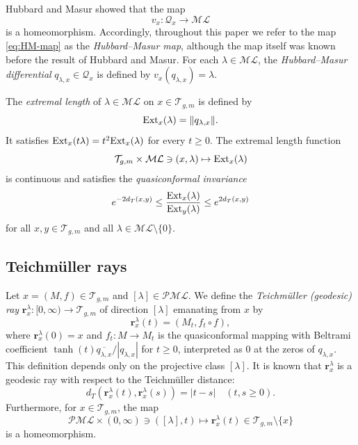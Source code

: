 \documentclass[dvipdfmx]{amsart}
\theoremstyle{remark}
\newcommand{\ext}{{\rm Ext}}
\newcommand{\teich}{\mathcal{T}}
\newcommand{\ray}{{\boldsymbol r}}
\newcommand{\ml}{\mathcal{ML}}
\newcommand{\pml}{\mathcal{PML}}
\begin{document}
Hubbard and Masur \cite{HubbardMasur1979} showed that the map
\begin{equation}
\label{eq:HM-map}
v_x\colon \mathcal{Q}_x\longrightarrow \ml
\end{equation}
is a homeomorphism. Accordingly, throughout this paper we refer to the map \eqref{eq:HM-map} as the \emph{Hubbard--Masur map}, although the map itself was known before the result of Hubbard and Masur. For each $\lambda\in\ml$, the \emph{Hubbard--Masur differential} $q_{\lambda,x}\in\mathcal{Q}_x$ is defined by $v_x(q_{\lambda,x})=\lambda$.

The \emph{extremal length} of $\lambda\in \ml$ on $x\in \teich_{g,m}$ is defined by
\[
\ext_x(\lambda)=\|q_{\lambda,x}\|.
\]
It satisfies $\ext_x(t\lambda)=t^2\ext_x(\lambda)$ for every $t\ge 0$.
The extremal length function
\[
\teich_{g,m}\times \ml\ni (x,\lambda)\mapsto \ext_x(\lambda)
\]
is continuous and satisfies the \emph{quasiconformal invariance}
\begin{equation}
\label{eq:QC-inv_extremal_length}
e^{-2d_T(x,y)}\le \frac{\ext_x(\lambda)}{\ext_y(\lambda)}\le e^{2d_T(x,y)}
\end{equation}
for all $x,y\in \teich_{g,m}$ and all $\lambda\in\ml\setminus\{0\}$.

\subsection{Teichm\"uller rays}
Let $x=(M,f)\in\teich_{g,m}$ and $[\lambda]\in\pml$. We define the \emph{Teichm\"uller (geodesic) ray} $\ray^\lambda_x\colon[0,\infty)\to\teich_{g,m}$ of direction $[\lambda]$ emanating from $x$ by
\[
\ray^{\lambda}_x(t)=(M_t,f_t\circ f),
\]
where $\ray^{\lambda}_x(0)=x$ and $f_t\colon M\to M_t$ is the quasiconformal mapping with Beltrami coefficient $\tanh(t)\overline{q_{\lambda,x}}/|q_{\lambda,x}|$ for $t\ge 0$, interpreted as $0$ at the zeros of $q_{\lambda,x}$. This definition depends only on the projective class $[\lambda]$.
It is known that $\ray^\lambda_x$ is a geodesic ray with respect to the Teichm\"uller distance:
\[
d_T(\ray^\lambda_x(t),\ray^\lambda_x(s))=|t-s|\quad (t,s\ge 0).
\]
Furthermore, for $x\in \teich_{g,m}$, the map
\[
\pml\times (0,\infty)\ni ([\lambda],t)\mapsto \ray^\lambda_x(t)\in \teich_{g,m}\setminus \{x\}
\]
is a homeomorphism.
\end{document}
